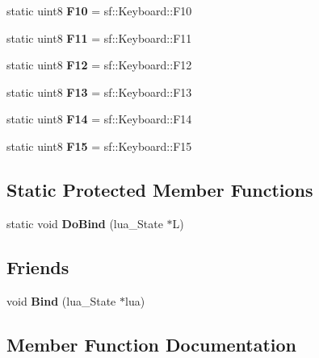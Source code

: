 \begin{DoxyCompactItemize}
static uint8 {\bfseries F10} = sf\+::\+Keyboard\+::\+F10
\item 
\mbox{\label{structrvl_1_1_keyboard_a67400d809506bfb295c2a468301e0166}} 
static uint8 {\bfseries F11} = sf\+::\+Keyboard\+::\+F11
\item 
\mbox{\label{structrvl_1_1_keyboard_aa2f22096da4ac1a01594068540af2ebc}} 
static uint8 {\bfseries F12} = sf\+::\+Keyboard\+::\+F12
\item 
\mbox{\label{structrvl_1_1_keyboard_a8ccd2d2b61683376a5f1057a16b6910b}} 
static uint8 {\bfseries F13} = sf\+::\+Keyboard\+::\+F13
\item 
\mbox{\label{structrvl_1_1_keyboard_a58c3b567ea225e44defe9ca8d717e2a3}} 
static uint8 {\bfseries F14} = sf\+::\+Keyboard\+::\+F14
\item 
\mbox{\label{structrvl_1_1_keyboard_ae0339887028d03781a793bbfd1a7d7b2}} 
static uint8 {\bfseries F15} = sf\+::\+Keyboard\+::\+F15
\end{DoxyCompactItemize}
\subsection*{Static Protected Member Functions}
\begin{DoxyCompactItemize}
\item 
\mbox{\label{structrvl_1_1_keyboard_a743b7b02ff5d880d5ac29acb75d83814}} 
static void {\bfseries Do\+Bind} (lua\+\_\+\+State $\ast$L)
\end{DoxyCompactItemize}
\subsection*{Friends}
\begin{DoxyCompactItemize}
\item 
\mbox{\label{structrvl_1_1_keyboard_ae2afc457cf6dc7525f508a00f05f8d58}} 
void {\bfseries Bind} (lua\+\_\+\+State $\ast$lua)
\end{DoxyCompactItemize}


\subsection{Member Function Documentation}
\mbox{\label{structrvl_1_1_keyboard_aad30f3f55bf55d1280d11aa69032b59c}} 
